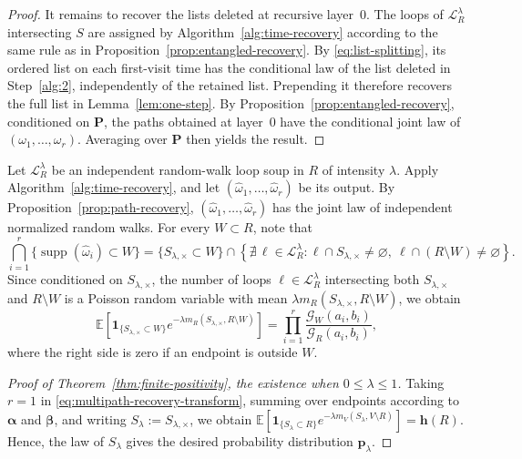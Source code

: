 \documentclass[11pt]{article}
\numberwithin{equation}{section}
\newcommand{\E}{\mathbb{E}}
\newcommand{\1}{\mathbf{1}}
\newcommand\wh[1]{\widehat{#1}}
\newcommand{\supp}{\operatorname{supp}}
\newcommand{\one}{\mathbf 1}
\newcommand{\Lc}{\mathcal L}
\newcommand{\Gc}{\mathcal G}
\newcommand{\balpha}{\boldsymbol{\alpha}}
\newcommand{\bbeta}{\boldsymbol{\beta}}
\newcommand{\bp}{\mathbf p}
\newcommand{\bh}{\mathbf h}
\begin{document}
\begin{proof}
It remains to recover the lists deleted at recursive layer~$0$.  The loops of
$\Lc_R^\lambda$ intersecting $S$ are assigned by
Algorithm~\ref{alg:time-recovery} according to the same rule as in
Proposition~\ref{prop:entangled-recovery}.  By
\eqref{eq:list-splitting}, its ordered list on each first-visit
time has the conditional law of the list deleted in
Step~\ref{alg:2}, independently of the retained list. Prepending it therefore recovers the full list in
Lemma~\ref{lem:one-step}.
By Proposition~\ref{prop:entangled-recovery}, conditioned on
$\boldsymbol P$, the paths obtained at layer~$0$ have the conditional
joint law of $(\omega_1,\ldots,\omega_r)$.  Averaging over
$\boldsymbol P$ then yields the result.
\end{proof}

Let $\Lc_R^\lambda$ be an independent random-walk loop soup in $R$ of intensity $\lambda$. Apply
Algorithm~\ref{alg:time-recovery}, and let
$(\widehat\omega_1,\ldots,\widehat\omega_r)$ be its output. By Proposition~\ref{prop:path-recovery}, $(\widehat\omega_1,\ldots,\wh\omega_r)$ has the joint law of independent normalized random walks. For every
$W\subset R$, note that
\[
 \bigcap_{i=1}^r\{\supp(\widehat\omega_i)\subset W\}
 =\{S_{\lambda,\times}\subset W\}
 \cap
 \left\{\nexists\,\ell\in\Lc_R^\lambda:
 \ell\cap S_{\lambda,\times}\ne\varnothing,\
 \ell\cap(R\setminus W)\ne\varnothing\right\}.
\]
Since conditioned on $S_{\lambda,\times}$, the number of loops $\ell\in\Lc_R^\lambda$ intersecting both $S_{\lambda,\times}$ and $R\setminus W$ is a Poisson random variable with mean
$\lambda m_R(S_{\lambda,\times},R\setminus W)$, we obtain
\begin{equation}\label{eq:multipath-recovery-transform}
 \E\left[
  \one_{\{S_{\lambda,\times}\subset W\}}
  e^{-\lambda m_R(S_{\lambda,\times},R\setminus W)}
 \right]
 =\prod_{i=1}^r\frac{\Gc_W(a_i,b_i)}{\Gc_R(a_i,b_i)},
\end{equation}
where the right side is zero if an endpoint is outside $W$.

\begin{proof}[Proof of Theorem~\ref{thm:finite-positivity}, the existence when $0\le\lambda\le 1$]
Taking $r=1$ in \eqref{eq:multipath-recovery-transform}, summing over endpoints according to $\balpha$ and $\bbeta$, and writing $S_\lambda:=S_{\lambda,\times}$, we obtain
\(
 \E\left[\one_{\{S_\lambda\subset R\}}
 e^{-\lambda m_V(S_\lambda,V\setminus R)}\right]=\bh(R)
\).
Hence, the law of $S_\lambda$ gives the desired probability distribution $\bp_\lambda$.
\end{proof}
\end{document}
